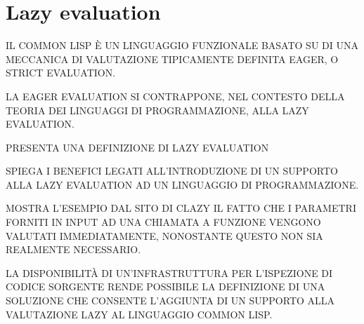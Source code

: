\section{Lazy evaluation}
\label{lazy}

IL COMMON LISP È UN LINGUAGGIO FUNZIONALE BASATO SU DI UNA MECCANICA DI
VALUTAZIONE TIPICAMENTE DEFINITA EAGER, O STRICT EVALUATION.

LA EAGER EVALUATION SI CONTRAPPONE, NEL CONTESTO DELLA TEORIA DEI LINGUAGGI DI
PROGRAMMAZIONE, ALLA LAZY EVALUATION.

PRESENTA UNA DEFINIZIONE DI LAZY EVALUATION

SPIEGA I BENEFICI LEGATI ALL'INTRODUZIONE DI UN SUPPORTO ALLA LAZY EVALUATION AD
UN LINGUAGGIO DI PROGRAMMAZIONE.

MOSTRA L'ESEMPIO DAL SITO DI CLAZY IL FATTO CHE I PARAMETRI FORNITI IN INPUT AD
UNA CHIAMATA A FUNZIONE VENGONO VALUTATI IMMEDIATAMENTE, NONOSTANTE QUESTO NON
SIA REALMENTE NECESSARIO.

LA DISPONIBILITÀ DI UN'INFRASTRUTTURA PER L'ISPEZIONE DI CODICE SORGENTE RENDE
POSSIBILE LA DEFINIZIONE DI UNA SOLUZIONE CHE CONSENTE L'AGGIUNTA DI UN SUPPORTO
ALLA VALUTAZIONE LAZY AL LINGUAGGIO COMMON LISP.
